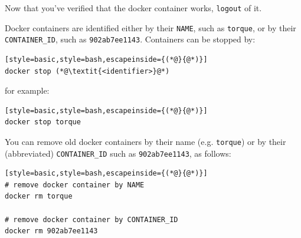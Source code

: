 \documentclass[12pt, a4paper, twoside, openany, titlepage]{book}
\begin{document}
Now that you've verified that the docker container works, \texttt{logout} of it.

Docker containers are identified either by their \texttt{NAME}, such as \texttt{torque}, or by their \texttt{CONTAINER\_ID}, such as \texttt{902ab7ee1143}. Containers can be stopped by:
\begin{lstlisting}[style=basic,style=bash,escapeinside={(*@}{@*)}]
docker stop (*@\textit{<identifier>}@*)
\end{lstlisting}
for example:
\begin{lstlisting}[style=basic,style=bash,escapeinside={(*@}{@*)}]
docker stop torque
\end{lstlisting}

You can remove old docker containers by their name (e.g. \texttt{torque}) or by their (abbreviated) \texttt{CONTAINER\_ID} such as \texttt{902ab7ee1143}, as follows:
\begin{lstlisting}[style=basic,style=bash,escapeinside={(*@}{@*)}]
# remove docker container by NAME
docker rm torque

# remove docker container by CONTAINER_ID
docker rm 902ab7ee1143
\end{lstlisting} %











\backmatter

\printindex
\end{document}
